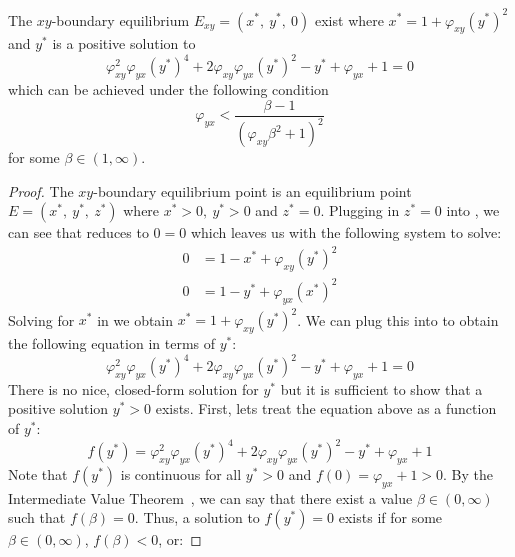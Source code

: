 \begin{theorem}\label{thm:boundary-xy-exist}
    The $xy$-boundary equilibrium $E_{xy}=\left(x^*,\ y^*,\ 0\right)$ exist where $x^*=1+\varphi_{xy}\left(y^*\right)^2$ and $y^*$ is a positive solution to
    \begin{equation*}
        \varphi_{xy}^2\varphi_{yx}\left(y^*\right)^4+2\varphi_{xy}\varphi_{yx}\left(y^*\right)^2-y^*+\varphi_{yx}+1=0
    \end{equation*}
    which can be achieved under the following condition
    \begin{equation*}
        \varphi_{yx}<\frac{\beta-1}{\left(\varphi_{xy}\beta^2+1\right)^2}
    \end{equation*}
    for some $\beta\in\left(1, \infty\right)$.
\end{theorem}
\begin{proof}
    The $xy$-boundary equilibrium point is an equilibrium point $E=\left(x^*,\ y^*,\ z^*\right)$ where $x^*>0,\ y^*>0$ and $z^*=0$. Plugging in $z^*=0$ into , we can see that  reduces to $0=0$ which leaves us with the following system to solve:
    \begin{subequations}\label{system:xy-boundary}
        \begin{align}
            0 &= 1-x^*+\varphi_{xy}\left(y^*\right)^2 \label{eq:xy-boundary-x}\\
            0 &= 1-y^*+\varphi_{yx}\left(x^*\right)^2 \label{eq:xy-boundary-y}
        \end{align}
    \end{subequations}
    Solving for $x^*$ in  we obtain $x^*=1+\varphi_{xy}\left(y^*\right)^2$. We can plug this into  to obtain the following equation in terms of $y^*$:
    \begin{equation*}
        \varphi_{xy}^2\varphi_{yx}\left(y^*\right)^4+2\varphi_{xy}\varphi_{yx}\left(y^*\right)^2-y^*+\varphi_{yx}+1=0
    \end{equation*}
    There is no nice, closed-form solution for $y^*$ but it is sufficient to show that a positive solution $y^*>0$ exists. First, lets treat the equation above as a function of $y^*$:
    \begin{equation*}
        f\left(y^*\right)=\varphi_{xy}^2\varphi_{yx}\left(y^*\right)^4+2\varphi_{xy}\varphi_{yx}\left(y^*\right)^2-y^*+\varphi_{yx}+1
    \end{equation*}
    Note that $f\left(y^*\right)$ is continuous for all $y^*>0$ and $f(0)=\varphi_{yx}+1>0$. By the Intermediate Value Theorem~\cite{STEWART9781337613927}, we can say that there exist a value $\beta\in\left(0,\infty\right)$ such that $f(\beta)=0$. Thus, a solution to $f\left(y^*\right)=0$ exists if for some $\beta\in\left(0,\infty\right)$, $f\left(\beta\right)<0$, or:

\end{proof}
